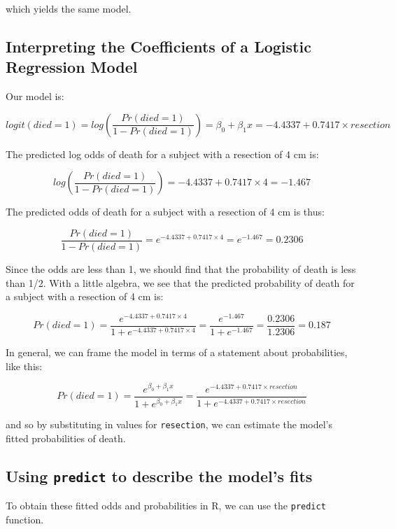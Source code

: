 \documentclass[]{book}
\theoremstyle{definition}
\theoremstyle{definition}
\theoremstyle{definition}
\theoremstyle{remark}
\begin{document}
which yields the same model.

\subsection{Interpreting the Coefficients of a Logistic Regression
Model}\label{interpreting-the-coefficients-of-a-logistic-regression-model-1}

Our model is:

\[
logit(died = 1) = log\left(\frac{Pr(died = 1)}{1 - Pr(died = 1)}\right) = \beta_0 + \beta_1 x = -4.4337 + 0.7417 \times resection
\]

The predicted log odds of death for a subject with a resection of 4 cm
is:

\[
log\left(\frac{Pr(died = 1)}{1 - Pr(died = 1)}\right) = -4.4337 + 0.7417 \times 4 = -1.467
\]

The predicted odds of death for a subject with a resection of 4 cm is
thus:

\[
\frac{Pr(died = 1)}{1 - Pr(died = 1)} = e^{-4.4337 + 0.7417 \times 4} = e^{-1.467} = 0.2306
\]

Since the odds are less than 1, we should find that the probability of
death is less than 1/2. With a little algebra, we see that the predicted
probability of death for a subject with a resection of 4 cm is:

\[
Pr(died = 1) = \frac{e^{-4.4337 + 0.7417 \times 4}}{1 + e^{-4.4337 + 0.7417 \times 4}} = \frac{e^{-1.467}}{1 + e^{-1.467}} = \frac{0.2306}{1.2306} = 0.187
\]

In general, we can frame the model in terms of a statement about
probabilities, like this:

\[
Pr(died = 1) = \frac{e^{\beta_0 + \beta_1 x}}{1 + {e^{\beta_0 + \beta_1 x}}} = \frac{e^{-4.4337 + 0.7417 \times resection}}{1 + e^{-4.4337 + 0.7417 \times resection}}
\]

and so by substituting in values for \texttt{resection}, we can estimate
the model's fitted probabilities of death.

\subsection{\texorpdfstring{Using \texttt{predict} to describe the
model's
fits}{Using predict to describe the model's fits}}\label{using-predict-to-describe-the-models-fits}

To obtain these fitted odds and probabilities in R, we can use the
\texttt{predict} function.
\end{document}
